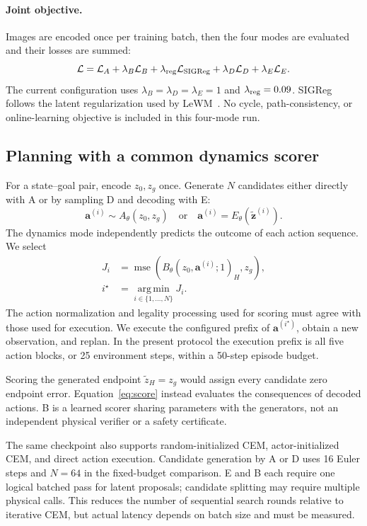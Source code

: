 \paragraph{Joint objective.}
Images are encoded once per training batch, then the four modes are evaluated and their losses are summed:
\begin{equation}
  \mathcal L =
  \mathcal L_A+\lambda_B\mathcal L_B+
  \lambda_{\rm reg}\mathcal L_{\rm SIGReg}+
  \lambda_D\mathcal L_D+\lambda_E\mathcal L_E.
  \label{eq:joint}
\end{equation}
The current configuration uses $\lambda_B=\lambda_D=\lambda_E=1$ and $\lambda_{\rm reg}=0.09$. SIGReg follows the latent regularization used by LeWM~\cite{maes2026lewm}. No cycle, path-consistency, or online-learning objective is included in this four-mode run.

\subsection{Planning with a common dynamics scorer}
\label{sec:planning}

For a state--goal pair, encode $z_0,z_g$ once. Generate $N$ candidates either directly with A or by sampling D and decoding with E:
\begin{equation}
 \mathbf a^{(i)}\sim A_\theta(z_0,z_g)
 \quad\text{or}\quad
 \mathbf a^{(i)}=E_\theta(\tilde{\mathbf z}^{(i)}).
\end{equation}
The dynamics mode independently predicts the outcome of each action sequence. We select
\begin{equation}
 \begin{split}
 J_i&=\operatorname{mse}\!\left(
 B_\theta(z_0,\mathbf a^{(i)};1)_H,z_g\right),\\
 i^\star&=\operatorname*{arg\,min}_{i\in\{1,\ldots,N\}}J_i.
 \end{split}
 \label{eq:score}
\end{equation}
The action normalization and legality processing used for scoring must agree with those used for execution. We execute the configured prefix of $\mathbf a^{(i^\star)}$, obtain a new observation, and replan. In the present protocol the execution prefix is all five action blocks, or 25 environment steps, within a 50-step episode budget.

Scoring the generated endpoint $\tilde z_H=z_g$ would assign every candidate zero endpoint error. Equation~\eqref{eq:score} instead evaluates the consequences of decoded actions. B is a learned scorer sharing parameters with the generators, not an independent physical verifier or a safety certificate.

The same checkpoint also supports random-initialized CEM, actor-initialized CEM, and direct action execution. Candidate generation by A or D uses 16 Euler steps and $N=64$ in the fixed-budget comparison. E and B each require one logical batched pass for latent proposals; candidate splitting may require multiple physical calls. This reduces the number of sequential search rounds relative to iterative CEM, but actual latency depends on batch size and must be measured.
